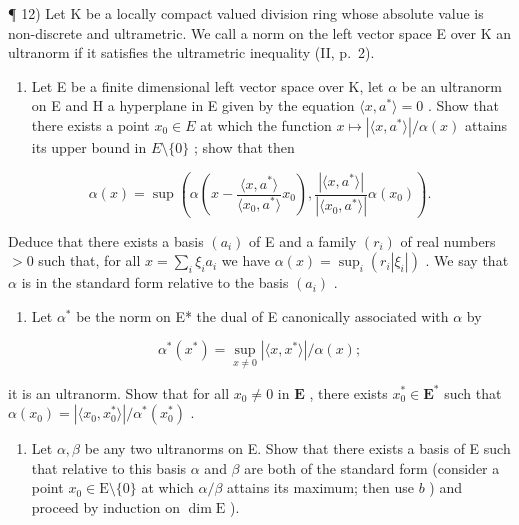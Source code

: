 ¶ 12) Let K be a locally compact valued division ring whose absolute value is non-discrete and ultrametric. We call a norm on the left vector space E over K an ultranorm if it satisfies the ultrametric inequality (II, p.~2).

\begin{enumerate}
\def\labelenumi{\alph{enumi})}
\tightlist
\item
  Let E be a finite dimensional left vector space over K, let \(\alpha\) be an ultranorm on E and H a hyperplane in E given by the equation \(\langle x, a^{*} \rangle = 0\) . Show that there exists a point \(x_{0} \in E\) at which the function \(x \mapsto |\langle x, a^{*} \rangle| / \alpha(x)\) attains its upper bound in \(E \setminus \{0\}\) ; show that then
\end{enumerate}

\[
\alpha (x) = \sup \left(\alpha \left(x - \frac {\langle x , a ^ {*} \rangle}{\langle x _ {0} , a ^ {*} \rangle} x _ {0}\right), \frac {| \langle x , a ^ {*} \rangle |}{| \langle x _ {0} , a ^ {*} \rangle |} \alpha (x _ {0})\right).
\]

Deduce that there exists a basis \((a_{i})\) of E and a family \((r_i)\) of real numbers \(>0\) such that, for all \(x = \sum_{i} \xi_{i} a_{i}\) we have \(\alpha(x) = \sup_{i} (r_{i} |\xi_{i}|)\) . We say that \(\alpha\) is in the standard form relative to the basis \((a_{i})\) .

\begin{enumerate}
\def\labelenumi{\alph{enumi})}
\setcounter{enumi}{1}
\tightlist
\item
  Let \(\alpha^{*}\) be the norm on E* the dual of E canonically associated with \(\alpha\) by
\end{enumerate}

\[
\alpha^ {*} (x ^ {*}) = \sup _ {x \neq 0} | \langle x, x ^ {*} \rangle | / \alpha (x);
\]

it is an ultranorm. Show that for all \(x_0 \neq 0\) in \(\mathbf{E}\) , there exists \(x_0^* \in \mathbf{E}^*\) such that \(\alpha(x_0) = |\langle x_0, x_0^* \rangle| / \alpha^*(x_0^*)\) .

\begin{enumerate}
\def\labelenumi{\alph{enumi})}
\setcounter{enumi}{2}
\tightlist
\item
  Let \(\alpha, \beta\) be any two ultranorms on E. Show that there exists a basis of E such that relative to this basis \(\alpha\) and \(\beta\) are both of the standard form (consider a point \(x_0 \in \mathrm{E} \setminus \{0\}\) at which \(\alpha / \beta\) attains its maximum; then use \(b\) ) and proceed by induction on \(\dim \mathrm{E}\) ).
\end{enumerate}


